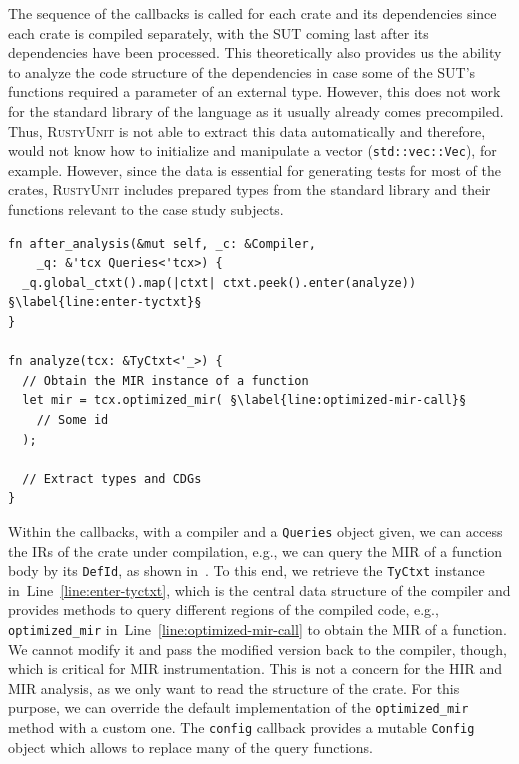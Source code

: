 \documentclass[paper=a4,%
  twoside,%
  BCOR4mm,%
  abstract=true,%
  toc=bibliography,%
  chapterprefix=true,%
  toc=bibliographynumbered,%
  open=right,%
  english,%
  pagesize=pdftex]{scrreprt}
\newcommand{\tech}{\textsc{RustyUnit}\xspace}
\newcommand{\hir}{\ac{HIR}\xspace}
\newcommand{\mir}{\ac{MIR}\xspace}
\newcommand{\sut}{\ac{SUT}\xspace}
\begin{document}
The sequence of the callbacks is called for each crate and its dependencies since each crate is compiled separately, with the \sut coming last after its dependencies have been processed. This theoretically also provides us the ability to analyze the code structure of the dependencies in case some of the \sut's functions required a parameter of an external type. However, this does not work for the standard library of the language as it usually already comes precompiled. Thus, \tech is not able to extract this data automatically and therefore, would not know how to initialize and manipulate a vector (\texttt{std::vec::Vec}), for example. However, since the data is essential for generating tests for most of the crates, \tech includes prepared types from the standard library and their functions relevant to the case study subjects. 

\begin{lstlisting}[style=boxed, caption={We can register a listener function to analyze the code structure of the compiled crate}, escapechar=§, label=lst:optimized-mir]
fn after_analysis(&mut self, _c: &Compiler, 
    _q: &'tcx Queries<'tcx>) {
  _q.global_ctxt().map(|ctxt| ctxt.peek().enter(analyze)) §\label{line:enter-tyctxt}§
}

fn analyze(tcx: &TyCtxt<'_>) {
  // Obtain the MIR instance of a function
  let mir = tcx.optimized_mir( §\label{line:optimized-mir-call}§
    // Some id
  );

  // Extract types and CDGs
}
\end{lstlisting}

Within the callbacks, with a compiler and a \texttt{Queries} object given, we can access the \acp{IR} of the crate under compilation, e.g., we can query the \mir of a function body by its \texttt{DefId}, as shown in~. To this end, we retrieve the \texttt{TyCtxt} instance in~Line~\ref{line:enter-tyctxt}, which is the central data structure of the compiler and provides methods to query different regions of the compiled code, e.g., \texttt{optimized\string_mir} in~Line~\ref{line:optimized-mir-call} to obtain the \mir of a function. We cannot modify it and pass the modified version back to the compiler, though, which is critical for \mir instrumentation. This is not a concern for the \hir and \mir analysis, as we only want to read the structure of the crate. For this purpose, we can override the default implementation of the \texttt{optimized\string_mir} method with a custom one. The \texttt{config} callback provides a mutable \texttt{Config} object which allows to replace many of the query functions. 
\end{document}
